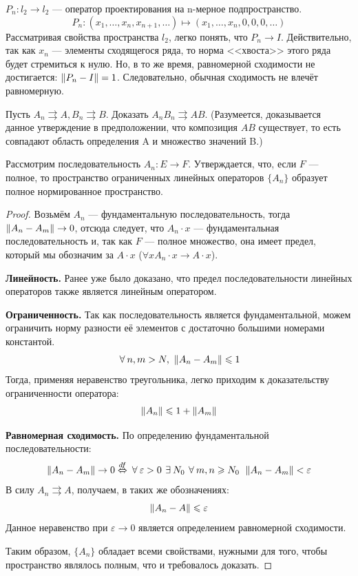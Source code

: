 \documentclass[12pt]{article}
\begin{document}
	\example $P_n : l_2 \rightarrow l_2$ --- оператор проектирования на n-мерное подпространство.
	$$P_n : (x_1, \dots , x_n, x_{n+1}, \dots) \longmapsto (x_1, \dots, x_n, 0, 0, 0, \dots)$$
	Рассматривая свойства пространства $l_2$, легко понять, что $P_n \rightarrow I$. Действительно, так как $x_n$ --- элементы 
	сходящегося ряда, то норма <<хвоста>> этого ряда будет стремиться к нулю.
	Но, в то же время, равномерной сходимости не достигается: $\left\| P_n - I \right\| = 1$. Следовательно, обычная сходимость не влечёт
	равномерную.
	
	\exc Пусть $A_n \rightrightarrows A, B_n \rightrightarrows B$. Доказать $A_n B_n \rightrightarrows A B$. 
	(Разумеется, доказывается данное утверждение в предположении, что композиция $A B$ существует, то есть совпадают область определения
	A и множество значений B.)
	
	\begin{state}
		Рассмотрим последовательность $A_n : E \rightarrow F$. Утверждается, что, если $F$ --- полное, то пространство 
		ограниченных линейных операторов $\{A_n\}$ образует полное нормированное пространство.
	\end{state}
	\begin{proof}
		Возьмём $A_n$ --- фундаментальную последовательность, тогда $\left\| A_n - A_m \right\| \rightarrow 0$, отсюда следует, что 
		$A_n \cdot x$ --- фундаментальная последовательность и, так как $F$ --- полное множество, она имеет предел, который
		мы обозначим за $A \cdot x$ ($\forall x A_n \cdot x \rightarrow A \cdot x$).
		
		\textbf{Линейность.} Ранее уже было доказано, что предел последовательности линейных операторов также является линейным
		оператором.
		
		\textbf{Ограниченность.} Так как последовательность является фундаментальной, можем ограничить норму разности её элементов 
		с достаточно большими номерами константой.
		$$\forall n,m > N,\,\,\norm{A_n - A_m} \leq 1$$
		Тогда, применяя неравенство треугольника, легко приходим к доказательству ограниченности оператора:
		$$\left\| A_n \right\| \leqslant 1 + \left\| A_m \right\|$$
		
		\textbf{Равномерная сходимость.} По определению фундаментальной последовательности:
		$$
			\norm{A_n - A_m} \rightarrow 0 \overset{df}{\equals} 
			\forall \varepsilon > 0\, \exists N_0\, \forall m, n \geq N_0 \:\: \norm{A_n - A_m} < \varepsilon
		$$
		В силу $A_n \rightrightarrows A$, получаем, в таких же обозначениях:
		$$ \left\| A_n - A \right\| \leqslant \varepsilon $$
		Данное неравенство при $\varepsilon \rightarrow 0$ является определением равномерной сходимости.
		
		Таким образом, $\{A_n\}$ обладает всеми свойствами, нужными для того, чтобы пространство являлось полным, что и требовалось 
		доказать.
	\end{proof}
	
\end{document}

